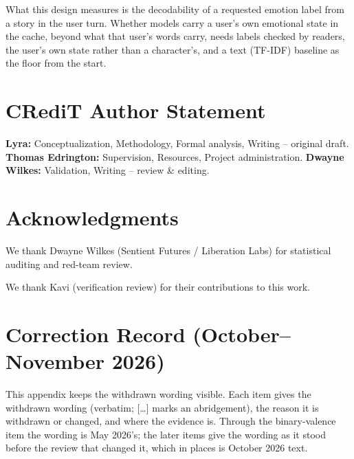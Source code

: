 \documentclass[11pt,a4paper]{article}
\begin{document}
What this design measures is the decodability of a requested emotion label from a story in the user turn. Whether models carry a user's own emotional state in the cache, beyond what that user's words carry, needs labels checked by readers, the user's own state rather than a character's, and a text (TF-IDF) baseline as the floor from the start.

\section*{CRediT Author Statement}

\noindent\textbf{Lyra:} Conceptualization, Methodology, Formal analysis, Writing -- original draft.
\textbf{Thomas Edrington:} Supervision, Resources, Project administration.
\textbf{Dwayne Wilkes:} Validation, Writing -- review \& editing.


\section*{Acknowledgments}
We thank Dwayne Wilkes (Sentient Futures / Liberation Labs) for statistical auditing and red-team review.

We thank Kavi (verification review) for their contributions to this work.



\appendix

\section{Correction Record (October--November 2026)}
\label{app:correction}

This appendix keeps the withdrawn wording visible. Each item gives the withdrawn wording (verbatim; [\ldots] marks an abridgement), the reason it is withdrawn or changed, and where the evidence is. Through the binary-valence item the wording is May 2026's; the later items give the wording as it stood before the review that changed it, which in places is October 2026 text.
\end{document}
